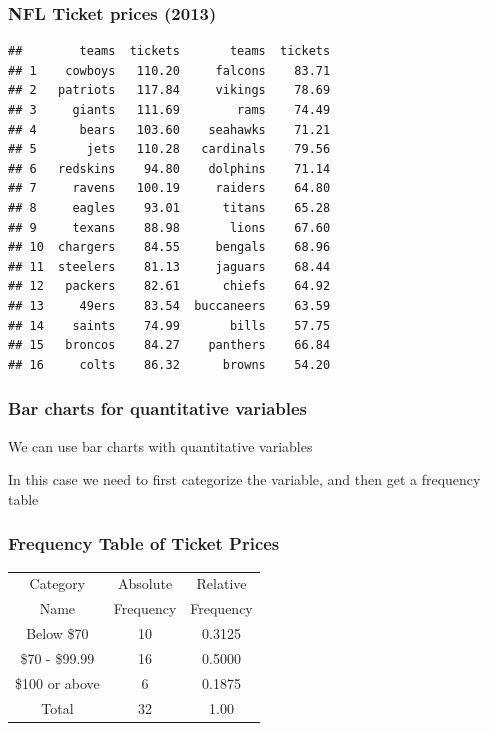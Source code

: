 \documentclass[12pt]{beamer}\usepackage[]{graphicx}\usepackage[]{color}
\makeatletter
\newenvironment{kframe}{%
 \def\at@end@of@kframe{}%
 \ifinner\ifhmode%
  \def\at@end@of@kframe{\end{minipage}}%
  \begin{minipage}{\columnwidth}%
 \fi\fi%
 \def\FrameCommand##1{\hskip\@totalleftmargin \hskip-\fboxsep
 \colorbox{shadecolor}{##1}\hskip-\fboxsep
     \hskip-\linewidth \hskip-\@totalleftmargin \hskip\columnwidth}%
 \MakeFramed {\advance\hsize-\width
   \@totalleftmargin\z@ \linewidth\hsize
   \@setminipage}}%
 {\par\unskip\endMakeFramed%
 \at@end@of@kframe}
\newenvironment{knitrout}{}{} %
\makeatother
\begin{document}
\begin{frame}[fragile]
\frametitle{NFL Ticket prices (2013)}
\begin{knitrout}\footnotesize
{}\color{fgcolor}\begin{kframe}
\begin{verbatim}
##        teams  tickets       teams  tickets
## 1    cowboys   110.20     falcons    83.71
## 2   patriots   117.84     vikings    78.69
## 3     giants   111.69        rams    74.49
## 4      bears   103.60    seahawks    71.21
## 5       jets   110.28   cardinals    79.56
## 6   redskins    94.80    dolphins    71.14
## 7     ravens   100.19     raiders    64.80
## 8     eagles    93.01      titans    65.28
## 9     texans    88.98       lions    67.60
## 10  chargers    84.55     bengals    68.96
## 11  steelers    81.13     jaguars    68.44
## 12   packers    82.61      chiefs    64.92
## 13     49ers    83.54  buccaneers    63.59
## 14    saints    74.99       bills    57.75
## 15   broncos    84.27    panthers    66.84
## 16     colts    86.32      browns    54.20
\end{verbatim}
\end{kframe}
\end{knitrout}
\end{frame}


\begin{frame}
\frametitle{Bar charts for quantitative variables}
\bbi
  \item We can use bar charts with quantitative variables
  \item In this case we need to first categorize the variable, and then get a frequency table
\ei
\end{frame}


\begin{frame}
\frametitle{Frequency Table of Ticket Prices}

{\large
\begin{center}
 \begin{tabular}{c c c}
  \hline
  Category & Absolute & Relative \\
  Name & Frequency & Frequency \\
  \hline
  Below \$70 & 10 & 0.3125 \\
  \$70 - \$99.99 & 16 & 0.5000 \\
  \$100 or above & 6 & 0.1875 \\
  \hline
  Total & 32 & 1.00 \\
 \end{tabular}
\end{center}
}

\end{frame}
\end{document}
